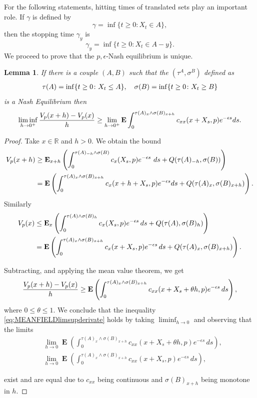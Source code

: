 \documentclass{article}
\newtheorem{lemma}[thm]{Lemma}
\newcommand{\R}{\mathbb{R}}%
\newcommand\E{\operatorname{\mathbf{E}}}
\begin{document}
%
%
For the following statements,  hitting times of translated sets play an important role.
If $\gamma$ is defined by
\[ 
\gamma = \inf \lbrace t\geq 0\colon X_t \in A \rbrace,
\]
then the stopping time $\gamma_y$ is 
\[ 
\gamma_y= \inf \lbrace t\geq 0\colon X_t \in A -y\rbrace.
\]
We proceed to prove that the $p,\epsilon$-Nash equilibrium is unique.
\begin{lemma}\label{L:MEANFIELDDynkinLipschitz}
If there is a couple $(A,B)$ such that the $(\tau^A,\sigma^B)$ defined as
$$\aligned
\tau(A) =\inf\{t\geq 0\colon X_t\leq A\}, \quad
\sigma(B) =\inf\{t\geq 0\colon X_t\geq B\}
\endaligned $$
is a Nash Equilibrium then
\begin{equation}\label{eq:MEANFIELDlimsupderivate}
\liminf_{h \to 0^+}{V_p(x+h)-V_p(x)\over h}\\ \geq  \lim_{h \to 0^+} \E\int_0^{\tau(A)_{x}\wedge \sigma(B)_{x+h}}c_{xx}(x+X_s,p) e^{-\epsilon s}ds.
\end{equation}


\end{lemma}
%
\begin{proof}
Take $x\in\R$ and $h>0$. We obtain the bound
$$
\aligned
V_p(x+h)  &  \geq  \E_{x+h}\left( \int_0^{\tau(A)_{-h}\wedge\sigma(B)}c_x(X_s,p) e^{-\epsilon s}\ ds   +Q(\tau(A)_{-h},\sigma(B))\right) 
\\
        &=\E\left( \int_0^{\tau(A)_{x}\wedge\sigma(B)_{x+h}}c_x(x+h+X_s,p)e^{-\epsilon s}ds +Q(\tau(A)_x,\sigma(B)_{x+h})\right).\\
\endaligned
$$
Similarly
$$
\aligned
V_p(x)  &\leq  \E_{x}\left(\int_0^{\tau(A) \wedge\sigma(B)_{h}}c_x(X_s,p)e^{-\epsilon s}\,ds+Q(\tau(A),\sigma(B)_h)\right)\\
        &=\E\left( \int_0^{\tau(A)_{x}\wedge\sigma(B)_{x+h}}c_x(x+X_s,p)e^{-\epsilon s}\,ds+Q(\tau(A)_{x},\sigma(B)_{x+h})\right).\\
\endaligned
$$

Subtracting, and applying the mean value theorem, we get
$$
{V_p(x+h)-V_p(x)\over h}\geq \E\left(\int_0^{\tau(A)_{x}\wedge\sigma(B)_{x+h}}c_{xx}(x+X_s+\theta h,p) e^{-\epsilon s}\,ds\right),
$$
where $0\leq\theta\leq 1$. We conclude that the inequality \eqref{eq:MEANFIELDlimsupderivate} holds by taking $\liminf_{h \to 0}$ and observing that the limits
\begin{align*}
 &   \lim_{h \to 0}\E\left(\int_0^{\tau(A)_{x}\wedge\sigma(B)_{x+h}}c_{xx}(x+X_s+\theta h,p) e^{-\epsilon s}\,ds\right), \\
&    \lim_{h \to 0}\E\left(\int_0^{\tau(A)_{x}\wedge\sigma(B)_{x+h}}c_{xx}(x+X_s,p) e^{-\epsilon s}\,ds\right),\end{align*}

exist and are equal due to $c_{xx}$ being continuous and $\sigma(B)_{x+h}$ being monotone in $h$.
\end{proof}
\end{document}
